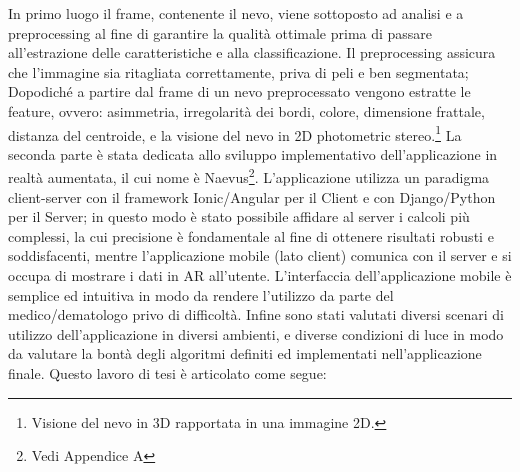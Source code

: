 In primo luogo il frame, contenente il nevo, viene sottoposto ad analisi e a preprocessing al fine di garantire la qualità ottimale prima di passare all'estrazione delle caratteristiche e alla classificazione.
\newline
Il preprocessing assicura che l'immagine sia ritagliata correttamente, priva di peli e ben segmentata;
Dopodiché a partire dal frame di un nevo preprocessato vengono estratte le feature, ovvero: asimmetria, irregolarità dei bordi, colore, dimensione frattale, distanza del centroide, e la visione del nevo in 2D photometric stereo.\footnote{Visione del nevo in 3D rapportata in una immagine 2D.}
\newline
La seconda parte è stata dedicata allo sviluppo implementativo dell'applicazione in realtà aumentata, il cui nome è Naevus\footnote{Vedi Appendice A}.
\newline
L'applicazione utilizza un paradigma client-server con il framework Ionic/Angular per il Client e con Django/Python per il Server; in questo modo è stato possibile affidare al server i calcoli più complessi, la cui precisione è fondamentale al fine di ottenere risultati robusti e soddisfacenti, mentre l'applicazione mobile (lato client) comunica con il server e si occupa di mostrare i dati in AR all'utente.
\newline
L'interfaccia dell'applicazione mobile è semplice ed intuitiva in modo da rendere l'utilizzo da parte del medico/dematologo privo di difficoltà.
\newline
Infine sono stati valutati diversi scenari di utilizzo dell'applicazione in diversi ambienti, e diverse condizioni di luce in modo da valutare la bontà degli algoritmi definiti ed implementati nell'applicazione finale.
\newline
Questo lavoro di tesi è articolato come segue:
